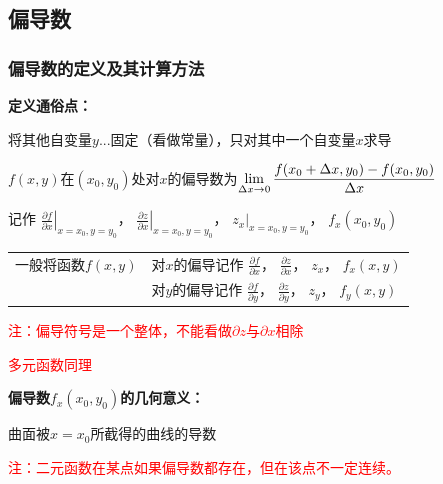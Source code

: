 \documentclass{article} %
\begin{document}
\subsection{偏导数}
\subsubsection{偏导数的定义及其计算方法}
\textbf{定义通俗点：}\par
\hspace{10mm}将其他自变量$y...$固定（看做常量），只对其中一个自变量$x$求导\par
\vspace{5mm} 
$f(x,y)$在$(x_0,y_0)$处对$x$的偏导数为$\displaystyle \lim_{\Delta x\to 0}{f(x_0+\Delta x,y_0)-f(x_0,y_0) \over \Delta x}$\par
记作
$\displaystyle\left.\frac{\partial f}{\partial x}\right|_{x=x_0,y=y_0}$，
$\displaystyle\left.\frac{\partial z}{\partial x}\right|_{x=x_0,y=y_0}$，
$\displaystyle\left.z_x\right|_{x=x_0,y=y_0}$，
$\displaystyle f_x(x_0,y_0)$\par
\vspace{5mm} 
\begin{tabular}{rl}
    一般将函数$f(x,y)$ & 对$x$的偏导记作
    $\displaystyle \frac{\partial f}{\partial x}$，
    $\displaystyle \frac{\partial z}{\partial x}$，
    $\displaystyle z_x$，
    $\displaystyle f_x(x,y)$\vspace{3mm}\\
    
    & 对$y$的偏导记作
    $\displaystyle \frac{\partial f}{\partial y}$，
    $\displaystyle \frac{\partial z}{\partial y}$，
    $\displaystyle z_y$，
    $\displaystyle f_y(x,y)$
\end{tabular}\par
\vspace{2mm}
\textcolor{red}{注：偏导符号是一个整体，不能看做$\partial z$与$\partial x$相除}\par
\vspace{3mm}
\textcolor{red}{多元函数同理}\par
\vspace{3mm}
\textbf{偏导数$\displaystyle f_x(x_0,y_0)$的几何意义：}\par
\hspace{10mm}曲面被$x=x_0$所截得的曲线的导数


\vspace{5mm}
\textcolor{red}{注：二元函数在某点如果偏导数都存在，但在该点不一定连续。}
\end{document}
